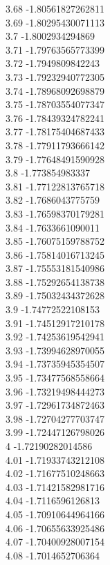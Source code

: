 {3.68	-1.80561827262811\\
3.69	-1.80295430071113\\
3.7	-1.8002934294869\\
3.71	-1.79763565773399\\
3.72	-1.7949809842243\\
3.73	-1.79232940772305\\
3.74	-1.78968092698879\\
3.75	-1.78703554077347\\
3.76	-1.78439324782241\\
3.77	-1.78175404687433\\
3.78	-1.77911793666142\\
3.79	-1.77648491590928\\
3.8	-1.773854983337\\
3.81	-1.77122813765718\\
3.82	-1.7686043775759\\
3.83	-1.76598370179281\\
3.84	-1.7633661090011\\
3.85	-1.76075159788752\\
3.86	-1.75814016713245\\
3.87	-1.75553181540986\\
3.88	-1.75292654138738\\
3.89	-1.75032434372628\\
3.9	-1.74772522108153\\
3.91	-1.74512917210178\\
3.92	-1.74253619542941\\
3.93	-1.73994628970055\\
3.94	-1.73735945354507\\
3.95	-1.73477568558664\\
3.96	-1.73219498444273\\
3.97	-1.72961734872463\\
3.98	-1.72704277703747\\
3.99	-1.72447126798026\\
4	-1.72190282014586\\
4.01	-1.71933743212108\\
4.02	-1.71677510248663\\
4.03	-1.71421582981716\\
4.04	-1.7116596126813\\
4.05	-1.70910644964166\\
4.06	-1.70655633925486\\
4.07	-1.70400928007154\\
4.08	-1.7014652706364\\
}
